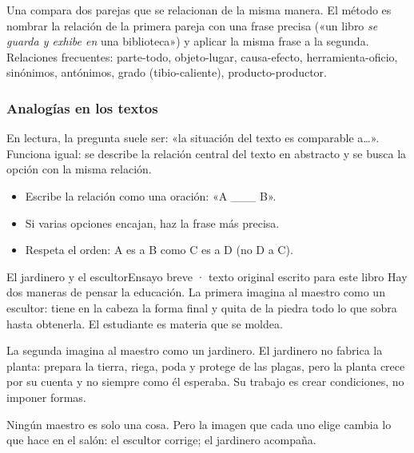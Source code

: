 \bitacora


Una  compara dos parejas que se relacionan de la misma manera. El método es nombrar la relación de la
primera pareja con una frase precisa («un libro \emph{se guarda y exhibe en} una biblioteca») y aplicar la misma frase a la
segunda. Relaciones frecuentes: parte-todo, objeto-lugar, causa-efecto, herramienta-oficio, sinónimos, antónimos,
grado (tibio-caliente), producto-productor.

\subsubsection{Analogías en los textos}
En lectura, la pregunta suele ser: «la situación del texto es comparable a…». Funciona igual: se describe la relación
central del texto en abstracto y se busca la opción con la misma relación.


\begin{regla}
\begin{itemize}
  \item Escribe la relación como una oración: «A \_\_\_ B».
  \item Si varias opciones encajan, haz la frase más precisa.
  \item Respeta el orden: A es a B como C es a D (no D a C).
\end{itemize}
\end{regla}

\begin{texto}{El jardinero y el escultor}{Ensayo breve · texto original escrito para este libro}
\pa Hay dos maneras de pensar la educación. La primera imagina al maestro como un escultor: tiene en la cabeza la forma
final y quita de la piedra todo lo que sobra hasta obtenerla. El estudiante es materia que se moldea.

\pa La segunda imagina al maestro como un jardinero. El jardinero no fabrica la planta: prepara la tierra, riega, poda y
protege de las plagas, pero la planta crece por su cuenta y no siempre como él esperaba. Su trabajo es crear condiciones,
no imponer formas.

\pa Ningún maestro es solo una cosa. Pero la imagen que cada uno elige cambia lo que hace en el salón: el escultor corrige;
el jardinero acompaña.
\end{texto}

